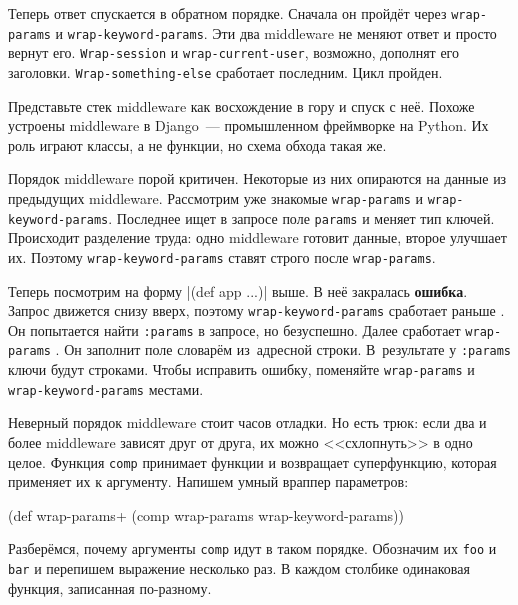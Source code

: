 Теперь ответ спускается в обратном порядке. Сначала он пройдёт через
\verb|wrap-params| и \verb|wrap-keyword-params|. Эти два middleware не меняют
ответ и просто вернут его. \verb|Wrap-session| и \verb|wrap-current-user|,
возможно, дополнят его заголовки. \texttt{Wrap\--some\-thing\--else} сработает
последним. Цикл пройден.


Представьте стек middleware как восхождение в гору и спуск с неё. Похоже
устроены middleware в Django~--- промышленном фреймворке на Python. Их роль
играют классы, а не функции, но схема обхода такая же.

Порядок middleware порой критичен. Некоторые из них опираются на данные из
предыдущих middleware. Рассмотрим уже знакомые \verb|wrap-params| и
\verb|wrap-keyword-params|. Последнее ищет в запросе поле \verb|params| и меняет
тип ключей. Происходит разделение труда: одно middleware готовит данные, второе
улучшает их. Поэтому \verb|wrap-keyword-params| ставят строго после
\verb|wrap-params|.


Теперь посмотрим на форму \spverb|(def app ...)| выше. В неё
закралась \textbf{ошибка}. Запрос движется снизу вверх, поэтому
\texttt{wrap\--key\-word\--params} сработает раньше . Он попытается найти
\verb|:params| в запросе, но безуспешно. Далее сработает \verb|wrap-params|
. Он заполнит поле словарём из~адресной строки. В~результате у
\verb|:params| ключи будут строками. Чтобы исправить ошибку, поменяйте
\verb|wrap-params| и \verb|wrap-keyword-params| местами.

Неверный порядок middleware стоит часов отладки. Но есть трюк: если два и более
middleware зависят друг от друга, их можно <<схлопнуть>> в одно целое. Функция
\verb|comp| принимает функции и возвращает суперфункцию, которая применяет их
к аргументу. Напишем умный враппер параметров:


\begin{english}
  \begin{clojure}
(def wrap-params+
  (comp wrap-params wrap-keyword-params))
  \end{clojure}
\end{english}

Разберёмся, почему аргументы \verb|comp| идут в таком порядке. Обозначим
их \verb|foo| и \verb|bar| и перепишем выражение несколько раз. В каждом
столбике одинаковая функция, записанная по-разному.


